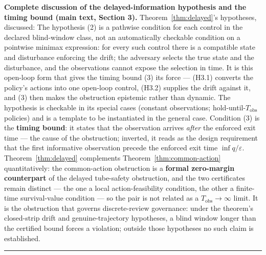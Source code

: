 \documentclass[11pt]{article}
\theoremstyle{definition}
\begin{document}
\bigskip
\noindent\textbf{Complete discussion of the delayed-information hypothesis and the timing bound (main text, Section 3).}
Theorem~\ref{thm:delayed}'s hypotheses, discussed:
The hypothesis (2) is a pathwise condition for each control in the declared blind-window class, not an automatically checkable condition on a pointwise minimax expression: for every such control
there is a compatible state and disturbance enforcing the drift; the
adversary selects the true state and the disturbance, and the
observations cannot expose the selection in time. It is this open-loop form that gives the timing bound (3) its force --- (H3.1) converts
the policy's actions into one open-loop control, (H3.2) supplies the
drift against it, and (3) then makes the obstruction epistemic rather
than dynamic. The hypothesis is checkable in its special cases (constant
observations; hold-until-\(T_{\mathrm{obs}}\) policies) and is a template to be instantiated in the general case. Condition (3) is
the \textbf{timing bound}: it states that the observation arrives
\emph{after} the enforced exit time --- the cause of the obstruction; inverted, it reads as the design requirement that the first informative observation precede the enforced exit time
\(\inf q / \varepsilon\). Theorem~\ref{thm:delayed} complements Theorem~\ref{thm:common-action} quantitatively:
the common-action obstruction is a \textbf{formal zero-margin counterpart}
of the delayed tube-safety obstruction, and the two certificates remain
distinct --- the one a local action-feasibility condition, the other a
finite-time survival-value condition --- so the pair is not related as a
\(T_{\mathrm{obs}} \to \infty\) limit. It is the obstruction that
governs discrete-review governance: under the theorem's closed-strip drift and genuine-trajectory hypotheses, a blind window
longer than the certified bound forces a violation; outside those
hypotheses no such claim is established.
\rule{0.5\linewidth}{0.5pt}
\end{document}

